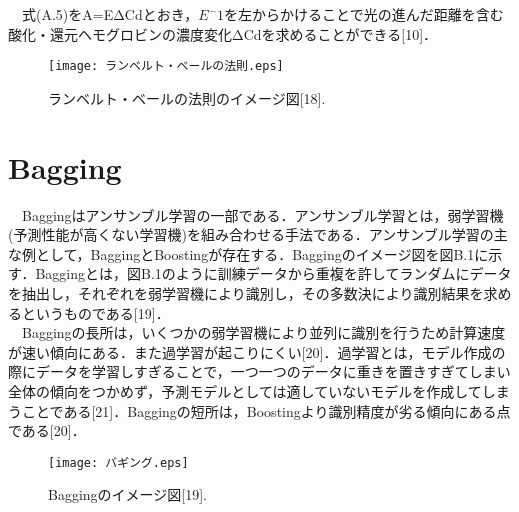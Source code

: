 \documentclass[a4j,12pt]{jreport}
\begin{document}
　式(A.5)をA=EΔCdとおき，$E^-1$を左からかけることで光の進んだ距離を含む酸化・還元ヘモグロビンの濃度変化ΔCdを求めることができる[10]．\\

\begin{figure}[t]
  \begin{center}
    \texttt{[image: ランベルト・ベールの法則.eps]}
    \caption{ランベルト・ベールの法則のイメージ図[18].}
    \label{fig}
  \end{center}
\end{figure}

\chapter{Bagging}
　Baggingはアンサンブル学習の一部である．アンサンブル学習とは，弱学習機(予測性能が高くない学習機)を組み合わせる手法である．アンサンブル学習の主な例として，BaggingとBoostingが存在する．Baggingのイメージ図を図B.1に示す．Baggingとは，図B.1のように訓練データから重複を許してランダムにデータを抽出し，それぞれを弱学習機により識別し，その多数決により識別結果を求めるというものである[19]．\\
　Baggingの長所は，いくつかの弱学習機により並列に識別を行うため計算速度が速い傾向にある．また過学習が起こりにくい[20]．過学習とは，モデル作成の際にデータを学習しすぎることで，一つ一つのデータに重きを置きすぎてしまい全体の傾向をつかめず，予測モデルとしては適していないモデルを作成してしまうことである[21]．Baggingの短所は，Boostingより識別精度が劣る傾向にある点である[20]．\\
\begin{figure}[t]
  \begin{center}
    \texttt{[image: バギング.eps]}
    \caption{Baggingのイメージ図[19].}
    \label{fig}
  \end{center}
\end{figure}
\end{document}
